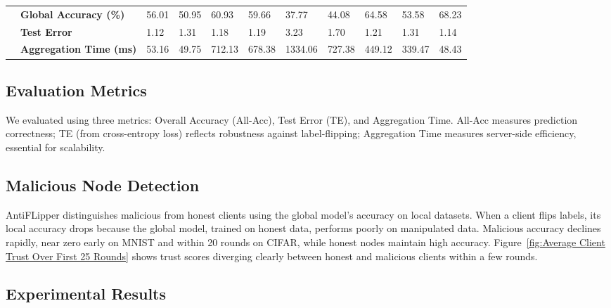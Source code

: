 \documentclass[conference]{IEEEtran}
\begin{document}
\begin{table}[tbh!]
\begin{tabular}{|c||p{3cm}||p{1.2cm}|p{1cm}|p{1cm}|p{1cm}|p{1cm}|p{1cm}|p{1cm}|p{1cm}|p{1.2cm}|}
& \textbf{Global Accuracy (\%)}   & 56.01 & 50.95 & 60.93 & 59.66 & 37.77 & 44.08 & 64.58  & 53.58  & 68.23  \\ 
& \textbf{Test Error}             & 1.12  & 1.31  & 1.18  & 1.19  & 3.23  & 1.70  & 1.21   & 1.31   & 1.14   \\ 
& \textbf{Aggregation Time (ms)} & 53.16 & 49.75 & 712.13 & 678.38 & 1334.06 & 727.38 & 449.12 & 339.47 & 48.43 \\ 
\hline\hline
\end{tabular} 
\label{table:result_table} 
\end{table}

\subsection{Evaluation Metrics}
We evaluated using three metrics: Overall Accuracy (All-Acc), Test Error (TE), and Aggregation Time. All-Acc measures prediction correctness; TE (from cross-entropy loss) reflects robustness against label-flipping; Aggregation Time measures server-side efficiency, essential for scalability.

\subsection{Malicious Node Detection}
AntiFLipper distinguishes malicious from honest clients using the global model's accuracy on local datasets. When a client flips labels, its local accuracy drops because the global model, trained on honest data, performs poorly on manipulated data. Malicious accuracy declines rapidly, near zero early on MNIST and within 20 rounds on CIFAR, while honest nodes maintain high accuracy. Figure~\ref{fig:Average Client Trust Over First 25 Rounds} shows trust scores diverging clearly between honest and malicious clients within a few rounds.

\subsection{Experimental Results}
\end{document}
